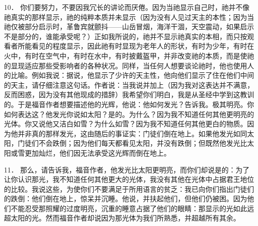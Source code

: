 10． 你们要努力，不要因我冗长的讲论而厌倦。因为当祂显示自己时，祂并不像祂真实的那样显示，祂的纯粹本质并未显示（因为没有人见过天主的本性；因为当祂仅被部分启示时，革鲁宾就颤抖——山岳冒烟，海洋干涸，天空震动，如果启示不是部分的，谁能承受呢？）正如我所说的，祂并不显示祂真实的本相，而只按观看者所能看见的程度显示，因此祂有时显现为老年人的形状，有时为少年，有时在火中，有时在空气中，有时在水中，有时披戴盔甲，并非改变祂的本质，而是使祂的显现适应那些受影响者的各种状况。同样，当任何人想要谈论祂时，他也使用人的比喻。例如我说：据说，他显示了少许的天主性，他向他们显示了住在他们中间的天主，请仔细注意这句话。作者说：当我说并加上（因为我对这表达并不满意，反而困惑，因为没有其他现成的措辞）我希望你们明白，我是从圣经中学到这教训的。于是福音作者想要描述他的光辉，他说：他如何发光？告诉我。极其明亮。你如何表达这？他发光你说如太阳？是的。为什么？因为我不知道任何其他更明亮的光体。你又说他又洁白如雪？为什么如雪？因为我不知道任何其他更白的物质。因为他并非真的那样发光，这由随后的事证实：门徒们倒在地上。如果他发光如同太阳，门徒们不会跌倒；因为他们每天都看见太阳，并没有跌倒；但既然他发光比太阳或雪更加灿烂，他们因无法承受这光辉而倒在地上。\par

11． 那么，请告诉我，福音作者，他发光比太阳更明亮，而你们却说是的：为了让你认识那光，我不知道任何其他更大的光体，我没有其他在光体中占据君王地位的比较。我说这些，为使你们不要满足于所用语言的贫乏：我已向你们指出门徒们的跌倒：他们倒在地上，惊呆并沉睡。他说，并扶起他们，但他们仍被困。因为他们不能忍受那照耀的过度明亮，沉重的睡意占据了他们的眼睛：那显示的光如此远超太阳的光。然而福音作者却说因为那光体为我们所熟悉，并超越所有其余。\par


